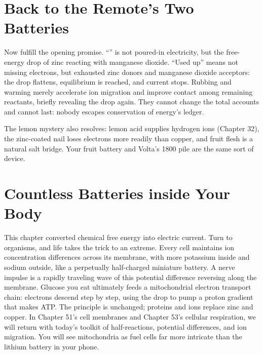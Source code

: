 \section{Back to the Remote's Two Batteries}

Now fulfill the opening promise. ``'' is not poured-in electricity, but the free-energy drop of zinc reacting with manganese dioxide. ``Used up'' means not missing electrons, but exhausted zinc donors and manganese dioxide acceptors: the drop flattens, equilibrium is reached, and current stops. Rubbing and warming merely accelerate ion migration and improve contact among remaining reactants, briefly revealing the drop again. They cannot change the total accounts and cannot last: nobody escapes conservation of energy's ledger.

The lemon mystery also resolves: lemon acid supplies hydrogen ions (Chapter 32), the zinc-coated nail loses electrons more readily than copper, and fruit flesh is a natural salt bridge. Your fruit battery and Volta's 1800 pile are the same sort of device.

\section{Countless Batteries inside Your Body}

This chapter converted chemical free energy into electric current. Turn to organisms, and life takes the trick to an extreme. Every cell maintains ion concentration differences across its membrane, with more potassium inside and sodium outside, like a perpetually half-charged miniature battery. A nerve impulse is a rapidly traveling wave of this potential difference reversing along the membrane. Glucose you eat ultimately feeds a mitochondrial electron transport chain: electrons descend step by step, using the drop to pump a proton gradient that makes ATP. The principle is unchanged; proteins and ions replace zinc and copper. In Chapter 51's cell membranes and Chapter 53's cellular respiration, we will return with today's toolkit of half-reactions, potential differences, and ion migration. You will see mitochondria as fuel cells far more intricate than the lithium battery in your phone.

